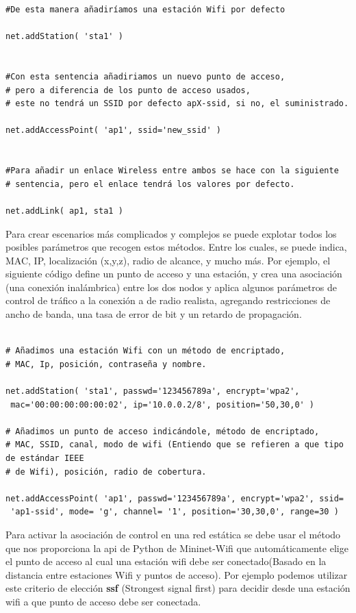 \begin{verbatim}
#De esta manera añadiríamos una estación Wifi por defecto

net.addStation( 'sta1' )


#Con esta sentencia añadiriamos un nuevo punto de acceso,
# pero a diferencia de los punto de acceso usados, 
# este no tendrá un SSID por defecto apX-ssid, si no, el suministrado.

net.addAccessPoint( 'ap1', ssid='new_ssid' )


#Para añadir un enlace Wireless entre ambos se hace con la siguiente
# sentencia, pero el enlace tendrá los valores por defecto.

net.addLink( ap1, sta1 )

\end{verbatim}

Para crear escenarios más complicados y complejos se puede explotar todos los posibles parámetros que recogen estos métodos. Entre los cuales, se puede indica, MAC, IP, localización (x,y,z), radio de alcance, y mucho más. Por ejemplo, el siguiente código define un punto de acceso y una estación, y crea una asociación (una conexión inalámbrica) entre los dos nodos y aplica algunos parámetros de control de tráfico a la conexión a de radio realista, agregando restricciones de ancho de banda, una tasa de error de bit y un
retardo de propagación.

\begin{verbatim}

# Añadimos una estación Wifi con un método de encriptado,
# MAC, Ip, posición, contraseña y nombre.

net.addStation( 'sta1', passwd='123456789a', encrypt='wpa2',
 mac='00:00:00:00:00:02', ip='10.0.0.2/8', position='50,30,0' )
 
# Añadimos un punto de acceso indicándole, método de encriptado,
# MAC, SSID, canal, modo de wifi (Entiendo que se refieren a que tipo de estándar IEEE 
# de Wifi), posición, radio de cobertura.

net.addAccessPoint( 'ap1', passwd='123456789a', encrypt='wpa2', ssid=
 'ap1-ssid', mode= 'g', channel= '1', position='30,30,0', range=30 )

\end{verbatim}

Para activar la asociación de control en una red estática se debe usar el método que nos proporciona la api de Python de Mininet-Wifi que automáticamente elige el punto de acceso al cual una estación wifi debe ser conectado(Basado en la distancia entre estaciones Wifi y puntos de acceso). Por ejemplo podemos utilizar este criterio de elección \textbf{ssf} (Strongest signal first) para decidir desde una estación wifi a que punto de acceso debe ser conectada.

